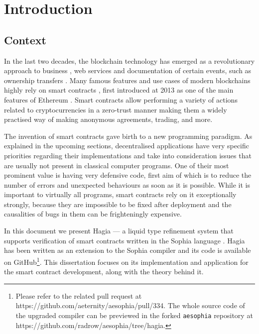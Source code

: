 \chapter{Introduction}

\section{Context}

In the last two decades, the blockchain technology \cite{Nakamoto:2008:RBP} has
emerged as a revolutionary approach to business \cite{noyen2014money,
  petukhina2020investing}, web services \cite{terzi2019blockchain} and
documentation of certain events, such as ownership transfers
\cite{wang2021nonfungible}. Many famous features and use cases of modern
blockchains highly rely on smart contracts \cite{khan2021}, first introduced at
2013 as one of the main features of Ethereum \cite{wood2014ethereum}. Smart
contracts allow performing a variety of actions related to cryptocurrencies in a
zero-trust manner making them a widely practised way of making anonymous
agreements, trading, and more.

The invention of smart contracts gave birth to a new programming paradigm. As
explained in the upcoming sections, decentralised applications have very
specific priorities regarding their implementations and take into consideration
issues that are usually not present in classical computer programs. One of their
most prominent value is having very defensive code, first aim of which is to
reduce the number of errors and unexpected behaviours as soon as it is possible.
While it is important to virtually all programs, smart contracts rely on it
exceptionally strongly, because they are impossible to be fixed after deployment
and the causalities of bugs in them can be frighteningly expensive.

In this document we present Hagia --- a liquid type refinement system that
supports verification of smart contracts written in the Sophia language
\cite{sophia}. Hagia has been written as an extension to the Sophia compiler and
its code is available on GitHub\footnote{Please refer to the related pull
  request at https://github.com/aeternity/aesophia/pull/334. The whole source
  code of the upgraded compiler can be previewed in the forked \texttt{aesophia}
  repository at https://github.com/radrow/aesophia/tree/hagia.}. This
dissertation focuses on its implementation and application for the smart
contract development, along with the theory behind it.

